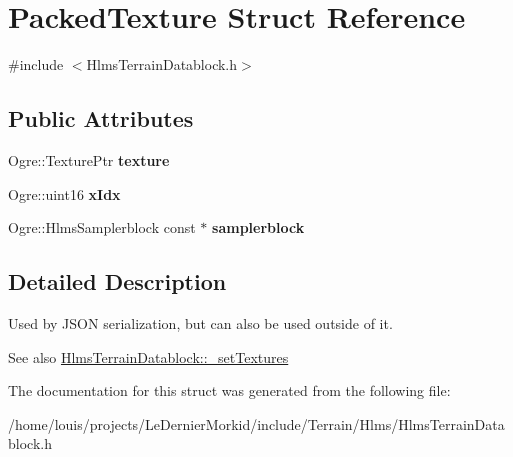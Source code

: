 \hypertarget{struct_packed_texture}{}\section{Packed\+Texture Struct Reference}
\label{struct_packed_texture}


{\ttfamily \#include $<$Hlms\+Terrain\+Datablock.\+h$>$}

\subsection*{Public Attributes}
\begin{DoxyCompactItemize}
\item 
\mbox{\label{struct_packed_texture_a95a48d6bd56b3fbefb6897a07dfbac13}} 
Ogre\+::\+Texture\+Ptr {\bfseries texture}
\item 
\mbox{\label{struct_packed_texture_ab79a459476c98fe4455bba13a106dcb1}} 
Ogre\+::uint16 {\bfseries x\+Idx}
\item 
\mbox{\label{struct_packed_texture_a3d790f2867b0a8ac166dbba8860c628d}} 
Ogre\+::\+Hlms\+Samplerblock const  $\ast$ {\bfseries samplerblock}
\end{DoxyCompactItemize}


\subsection{Detailed Description}
Used by J\+S\+ON serialization, but can also be used outside of it. \begin{DoxySeeAlso}{See also}
\hyperlink{class_hlms_terrain_datablock_a9491ff27ef7052bcce3edb825acc61fe}{Hlms\+Terrain\+Datablock\+::\+\_\+set\+Textures} 
\end{DoxySeeAlso}


The documentation for this struct was generated from the following file\+:\begin{DoxyCompactItemize}
\item 
/home/louis/projects/\+Le\+Dernier\+Morkid/include/\+Terrain/\+Hlms/Hlms\+Terrain\+Datablock.\+h\end{DoxyCompactItemize}
